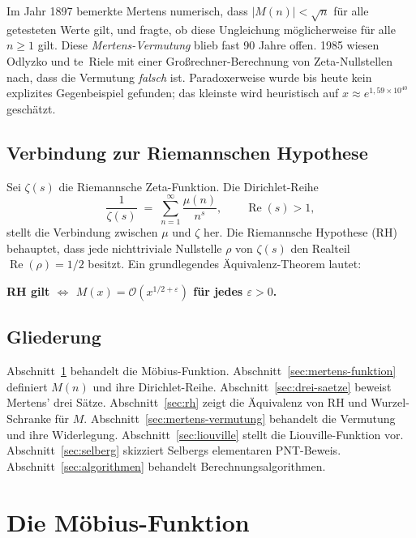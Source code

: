 \documentclass[12pt,a4paper]{amsart}
\theoremstyle{definition}
\newcommand{\BigO}{\mathcal{O}}
\begin{document}
Im Jahr 1897 bemerkte Mertens numerisch, dass $|M(n)| < \sqrt{n}$ für alle
getesteten Werte gilt, und fragte, ob diese Ungleichung möglicherweise für
alle $n \ge 1$ gilt.  Diese \emph{Mertens-Vermutung} blieb fast 90 Jahre
offen.  1985 wiesen Odlyzko und te~Riele \cite{OdlyzkoTeRiele1985} mit einer
Großrechner-Berechnung von Zeta-Nullstellen nach, dass die Vermutung
\emph{falsch} ist.  Paradoxerweise wurde bis heute kein explizites
Gegenbeispiel gefunden; das kleinste wird heuristisch auf
$x \approx e^{1{,}59 \times 10^{40}}$ geschätzt.

\subsection*{Verbindung zur Riemannschen Hypothese}

Sei $\zeta(s)$ die Riemannsche Zeta-Funktion.  Die Dirichlet-Reihe
\[
  \frac{1}{\zeta(s)} \;=\; \sum_{n=1}^{\infty} \frac{\mu(n)}{n^s},
  \qquad \operatorname{Re}(s) > 1,
\]
stellt die Verbindung zwischen $\mu$ und $\zeta$ her.  Die Riemannsche
Hypothese (RH) behauptet, dass jede nichttriviale Nullstelle $\rho$ von
$\zeta(s)$ den Realteil $\operatorname{Re}(\rho) = 1/2$ besitzt.  Ein
grundlegendes Äquivalenz-Theorem lautet:

\begin{center}
  \textbf{RH gilt $\Longleftrightarrow$ $M(x) = \BigO(x^{1/2+\varepsilon})$
  für jedes $\varepsilon > 0$.}
\end{center}

\subsection*{Gliederung}

Abschnitt~\ref{sec:mobius} behandelt die Möbius-Funktion.
Abschnitt~\ref{sec:mertens-funktion} definiert $M(n)$ und ihre Dirichlet-Reihe.
Abschnitt~\ref{sec:drei-saetze} beweist Mertens' drei Sätze.
Abschnitt~\ref{sec:rh} zeigt die Äquivalenz von RH und Wurzel-Schranke für $M$.
Abschnitt~\ref{sec:mertens-vermutung} behandelt die Vermutung und ihre Widerlegung.
Abschnitt~\ref{sec:liouville} stellt die Liouville-Funktion vor.
Abschnitt~\ref{sec:selberg} skizziert Selbergs elementaren PNT-Beweis.
Abschnitt~\ref{sec:algorithmen} behandelt Berechnungsalgorithmen.

\section{Die Möbius-Funktion}
\label{sec:mobius}
\end{document}
